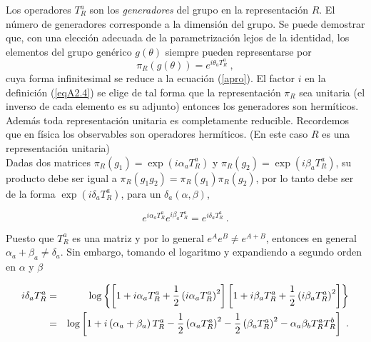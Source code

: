 Los operadores $T^{a}_R$ son los \emph{generadores} del grupo en la representación $R$. El número de generadores corresponde a la dimensión del grupo. Se puede demostrar que, con una elección adecuada de la parametrización lejos de la identidad, los elementos del grupo genérico $g(\theta)$ siempre pueden representarse por
\begin{equation}
    \pi_{R}(g(\theta)) = e^{i\theta_{a}T^{a}_{R}}~,
\end{equation}
cuya forma infinitesimal se reduce a la ecuación (\ref{apro}). El factor $i$ en la definición (\ref{eqA2.4}) se elige de tal forma que la representación $\pi_{R}$ sea unitaria (el inverso de cada elemento es su adjunto) entonces los generadores son hermíticos. Además toda representación unitaria es completamente reducible. Recordemos que en física los observables son operadores hermíticos. (En este caso $R$ es una representación unitaria)\\

Dadas dos matrices $\pi _{R}\left( g_{1}\right) =\exp \left( i\alpha_{a}T_{R}^{a}\right) $ y $\pi _{R}\left( g_{2}\right) =\exp \left( i\beta_{a}T_{R}^{a}\right) $, su producto debe ser igual a $\pi _{R}\left(g_{1}g_{2}\right) =\pi _{R}\left( g_{1}\right) \pi _{R}\left( g_{2}\right) $, por lo tanto debe ser de la forma $\exp \left( i\delta_{a}T_{R}^{a}\right) $, para un $\delta _{a}\left( \alpha ,\beta \right) $,

\begin{equation}
e^{i\alpha _{a}T_{R}^{a}}e^{i\beta _{a}T_{R}^{a}}=e^{i\delta _{a}T_{R}^{a}}~.
\label{eqA_2.6}
\end{equation}

Puesto que $T_{R}^{a}$ es una matriz y por lo general $e^{A}e^{B}\neq e^{A+B}$, entonces en general $\alpha _{a}+\beta _{a}\neq \delta _{a}$. Sin embargo, tomando el logaritmo y expandiendo a segundo orden en $\alpha $ y $\beta$

\begin{eqnarray}
i\delta _{a}T_{R}^{a} &=&\log \left\{ \left[ 1+i\alpha _{a}T_{R}^{a}+\frac{1
}{2}\left( i\alpha _{a}T_{R}^{a}\right) ^{2}\right] \left[ 1+i\beta
_{a}T_{R}^{a}+\frac{1}{2}\left( i\beta _{a}T_{R}^{a}\right) ^{2}\right]
\right\}  \\
&=&\log \left[ 1+i\left( \alpha _{a}+\beta _{a}\right) T_{R}^{a}-\frac{1}{2}
\left( \alpha _{a}T_{R}^{a}\right) ^{2}-\frac{1}{2}\left( \beta
_{a}T_{R}^{a}\right) ^{2}-\alpha _{a}\beta _{b}T_{R}^{a}T_{R}^{b}\right] ~. 
\notag
\end{eqnarray}

